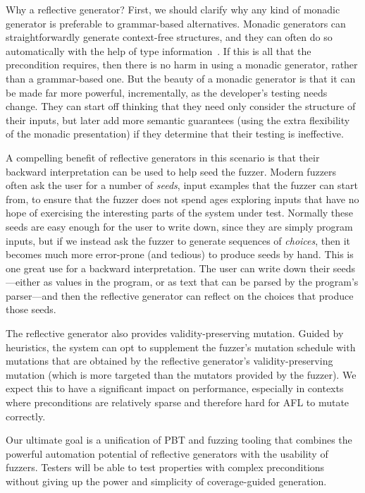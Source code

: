 Why a reflective generator? First, we should clarify why any kind of monadic
generator is preferable to grammar-based alternatives. Monadic generators can
straightforwardly generate context-free structures, and they can often do so
automatically with the help of type information~\cite{mista2019deriving}. If
this is all that the precondition requires, then there is no harm in using a
monadic generator, rather than a grammar-based one. But the beauty of a monadic
generator is that it can be made far more powerful, incrementally, as the
developer's testing needs change. They can start off thinking that they
need only consider the structure of their inputs, but later add more
semantic guarantees (using the extra flexibility of the monadic
presentation) if they determine that their testing is
ineffective. 

A compelling benefit of reflective generators in this scenario is that
their backward interpretation can be used to help seed the fuzzer.
Modern fuzzers often
ask the user for a number of {\em seeds}, input examples that the fuzzer can start from,
to ensure that the fuzzer does not spend ages exploring
inputs that have no hope of exercising the interesting parts of the
system under test. Normally these seeds are easy enough
for the user to write down, since they are simply program inputs, but if
we instead ask the fuzzer to generate sequences of {\em choices}, then
it becomes much more
error-prone (and tedious) to produce seeds by hand.  This is one great use for a
backward interpretation. The user can write down their seeds---either as values
in the program, or as text that can be parsed by the program's parser---and then
the reflective generator can reflect on the choices that produce those seeds.

The reflective generator also provides validity-preserving mutation. Guided by
heuristics, the system can opt to supplement the fuzzer's mutation schedule with
mutations that are obtained by the reflective generator's validity-preserving
mutation (which is more targeted than the mutators provided by the fuzzer). We
expect this to have a significant impact on performance, especially in contexts
where preconditions are relatively sparse and therefore hard for AFL to mutate
correctly.

Our ultimate goal is a unification of PBT and fuzzing tooling that combines the
powerful automation potential of reflective generators with the usability of
fuzzers. Testers will be able to test properties with complex preconditions
without giving up the power and simplicity of coverage-guided generation.
 

